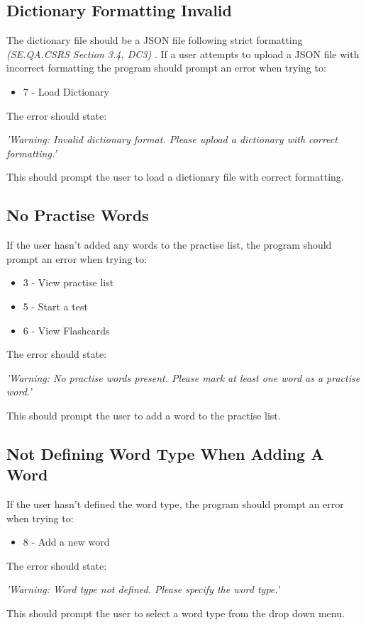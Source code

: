 \documentclass{project}
\begin{document}
\subsection{Dictionary Formatting Invalid}
The dictionary file should be a JSON file following strict formatting \emph{(SE.QA.CSRS Section 3.4, DC3)}\cite{se.qa.csrs} . If a user attempts to upload a JSON file with incorrect formatting the program should prompt an error when trying to:
\begin{itemize}
	\item 7 - Load Dictionary
\end{itemize}
The error should state:
\begin{center}
	\emph{'Warning: Invalid dictionary format. Please upload a dictionary with correct formatting.'}
\end{center}
This should prompt the user to load a dictionary file with correct formatting.
\subsection{No Practise Words}
If the user hasn't added any words to the practise list, the program should prompt an error when trying to:
\begin{itemize}
	\item 3 - View practise list
	\item 5 - Start a test
	\item 6 - View Flashcards
	\end{itemize}
The error should state:
\begin{center}
	\emph{'Warning: No practise words present. Please mark at least one word as a practise word.'}
\end{center}
This should prompt the user to add a word to the practise list.
\subsection{Not Defining Word Type When Adding A Word}
If the user hasn't defined the word type, the program should prompt an error when trying to:
\begin{itemize}
	\item 8 - Add a new word
	\end{itemize}
The error should state:
\begin{center}
	\emph{'Warning: Word type not defined. Please specify the word type.'}
\end{center}
This should prompt the user to select a word type from the drop down menu.
\end{document}
